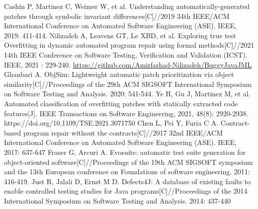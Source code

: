 \begin{thebibliography}{}
Cashin P, Martinez C, Weimer W, et al. Understanding automatically-generated patches through symbolic invariant differences[C]//2019 34th IEEE/ACM International Conference on Automated Software Engineering (ASE). IEEE, 2019: 411-414.
Nilizadeh A, Leavens GT, Le XBD, et al. Exploring true test Overfitting in dynamic automated program repair using formal methods[C]//2021 14th IEEE Conference on Software Testing, Verification and Validation (ICST). IEEE, 2021 : 229-240. \href{https://github.com/Amirfarhad-Nilizadeh/BuggyJavaJML}{https://github.com/Amirfarhad-Nilizadeh/BuggyJavaJML}
Ghanbari A. ObjSim: Lightweight automatic patch prioritization via object similarity[C]//Proceedings of the 29th ACM SIGSOFT International Symposium on Software Testing and Analysis. 2020: 541-544.
Ye H, Gu J, Martinez M, et al. Automated classification of overfitting patches with statically extracted code features[J]. IEEE Transactions on Software Engineering, 2021, 48(8): 2920-2938. 
https://doi.org/10.1109/TSE.2021.3071750
Chen L, Pei Y, Furia C A. Contract-based program repair without the contracts[C]//2017 32nd IEEE/ACM International Conference on Automated Software Engineering (ASE). IEEE, 2017: 637-647
Fraser G, Arcuri A. Evosuite: automatic test suite generation for object-oriented software[C]//Proceedings of the 19th ACM SIGSOFT symposium and the 13th European conference on Foundations of software engineering. 2011: 416-419.
Just R, Jalali D, Ernst M D. Defects4J: A database of existing faults to enable controlled testing studies for Java programs[C]//Proceedings of the 2014 International Symposium on Software Testing and Analysis. 2014: 437-440


\end{thebibliography}





